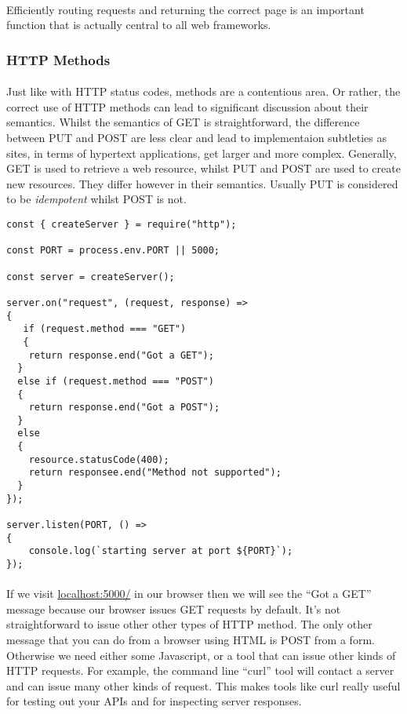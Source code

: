 \documentclass[10pt, a4paper, twosize]{article}
\begin{document}
\paragraph{} Efficiently routing requests and returning the correct page is an important function that is actually central to all web frameworks.



\subsubsection{HTTP Methods}
\paragraph{} Just like with HTTP status codes, methods are a contentious area. Or rather, the correct use of HTTP methods can lead to significant discussion about their semantics. Whilst the semantics of GET is straightforward, the difference between PUT and POST are less clear and lead to implementaion subtleties as sites, in terms of hypertext applications, get larger and more complex. Generally, GET is used to retrieve a web resource, whilst PUT and POST are used to create new resources. They differ however in their semantics. Usually PUT is considered to be \emph{idempotent} whilst POST is not.

\begin{lstlisting}
const { createServer } = require("http");

const PORT = process.env.PORT || 5000;

const server = createServer();

server.on("request", (request, response) => 
{
   if (request.method === "GET")
   {
    return response.end("Got a GET");
  } 
  else if (request.method === "POST") 
  {
    return response.end("Got a POST");
  } 
  else
  {
    resource.statusCode(400);
    return responsee.end("Method not supported");
  }
});

server.listen(PORT, () => 
{
    console.log(`starting server at port ${PORT}`);
});
\end{lstlisting}
\paragraph{} If we visit \url{localhost:5000/} in our browser then we will see the ``Got a GET'' message because our browser issues GET requests by default. It's not straightforward to issue other other types of HTTP method. The only other message that you can do from a browser using HTML is POST from a form. Otherwise we need either some Javascript, or a tool that can issue other kinds of HTTP requests. For example, the command line ``curl'' tool will contact a server and can issue many other kinds of request. This makes tools like curl really useful for testing out your APIs and for inspecting server responses.
\end{document}

